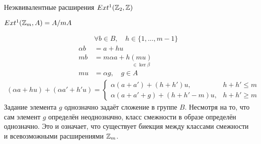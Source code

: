 \documentclass[../main.tex]{subfiles}
\begin{document}
\begin{to_ex}
Неэквивалентные расширения $Ext^1(\mathbb{Z}_2, \mathbb{Z})$
\bee
{}
\eee
\end{to_ex}
\begin{to_ex}
$Ext^1(\mathbb{Z}_m, A) = A /mA$
\bee
{}
\eee

\begin{align*}
    &\forall b \in B,\quad h \in \{1, ..., m-1\} \\
    \alpha b &= a + h u \\
    mb &= m\alpha a + h\underset{\in\ker \beta }{(mu)}\\
    mu &= \alpha g, \quad g \in A
\end{align*}
\begin{align*}
    (\alpha a + h u )+(\alpha a' + h'u) = \begin{cases}\alpha(a + a') + (h + h')u, & h + h' \le m \\ \alpha(a+a'+g) + (h + h' - m)u, & h+h' \geq m \end{cases}
\end{align*}
Задание элемента $g$ однозначно задаёт сложение в группе $B$. Несмотря на то, что сам элемент $g$ определён неоднозначно, класс смежности в образе определён однозначно. Это и означает, что существует биекция между классами смежности и всевозможными расширениями $\mathbb{Z}_m$. 
\end{to_ex} 
\end{document}
